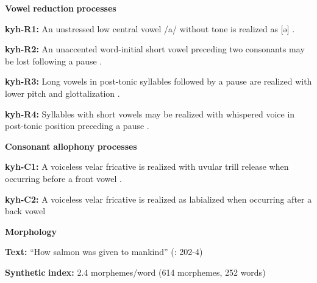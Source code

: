 \documentclass[output=paper]{langsci/langscibook}
\begin{document}
\begin{styleBody}
\textbf{Vowel} \textbf{reduction} \textbf{processes}
\end{styleBody}

\begin{styleBody}
\textbf{kyh-R1:} An unstressed low central vowel /a/ without tone is realized as [ə] \citep[11]{Bright1957}.
\end{styleBody}

\begin{styleBody}
\textbf{kyh-R2:} An unaccented word-initial short vowel preceding two consonants may be lost following a pause \citep[53]{Bright1957}.
\end{styleBody}

\begin{styleBody}
\textbf{kyh-R3:} Long vowels in post-tonic syllables followed by a pause are realized with lower pitch and glottalization \citep[13]{Bright1957}.
\end{styleBody}

\begin{styleBody}
\textbf{kyh-R4:} Syllables with short vowels may be realized with whispered voice in post-tonic position preceding a pause \citep[13]{Bright1957}.
\end{styleBody}

\begin{styleBody}
\textbf{Consonant} \textbf{allophony} \textbf{processes}
\end{styleBody}

\begin{styleBody}
\textbf{kyh-C1:} A voiceless velar fricative is realized with uvular trill release when occurring before a front vowel \citep{Bright1957}.
\end{styleBody}

\begin{styleBody}
\textbf{kyh-C2:} A voiceless velar fricative is realized as labialized when occurring after a back vowel \citep[8]{Bright1957}
\end{styleBody}

\begin{styleBody}
\textbf{Morphology}
\end{styleBody}

\begin{styleBody}
\textbf{Text:} “How salmon was given to mankind” (\citealt{AnguloFreeland1971}: 202-4)
\end{styleBody}

\begin{styleBody}
\textbf{Synthetic} \textbf{index:} 2.4 morphemes/word (614 morphemes, 252 words)
\end{styleBody}
\end{document}

